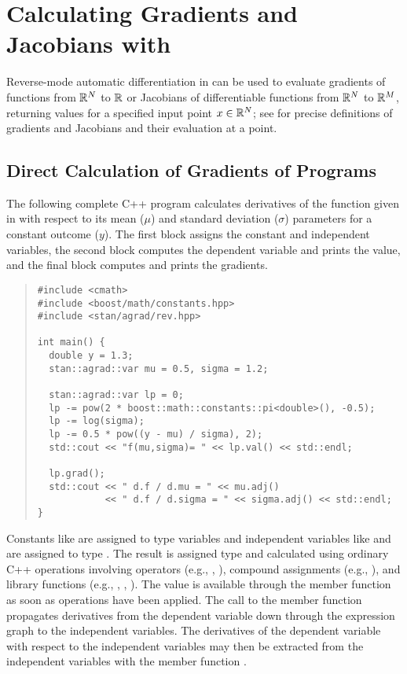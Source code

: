 \documentclass[10pt]{article}
\begin{document}
\section{Calculating Gradients and Jacobians with }

Reverse-mode automatic differentiation in  can be
used to evaluate gradients of functions from $\mathbb{R}^N$ to $\mathbb{R}$ or
Jacobians of differentiable functions from $\mathbb{R}^N$ to $\mathbb{R}^M$,
returning values for a specified input point $x \in \mathbb{R}^N$; see
 for precise definitions of
gradients and Jacobians and their evaluation at a point.

\subsection{Direct Calculation of Gradients of Programs}

The following complete C++ program calculates derivatives of the
function given in  with respect to its mean
($\mu$) and standard deviation ($\sigma$) parameters for a constant
outcome ($y$).  The first block assigns the constant and independent
variables, the second block computes the dependent variable and prints
the value, and the final block computes and prints the gradients.
%
\begin{quote}
\begin{Verbatim}
#include <cmath>
#include <boost/math/constants.hpp>
#include <stan/agrad/rev.hpp>

int main() { 
  double y = 1.3;
  stan::agrad::var mu = 0.5, sigma = 1.2;

  stan::agrad::var lp = 0;
  lp -= pow(2 * boost::math::constants::pi<double>(), -0.5);
  lp -= log(sigma);
  lp -= 0.5 * pow((y - mu) / sigma), 2);
  std::cout << "f(mu,sigma)= " << lp.val() << std::endl;

  lp.grad();
  std::cout << " d.f / d.mu = " << mu.adj()
            << " d.f / d.sigma = " << sigma.adj() << std::endl;
}
\end{Verbatim}
\end{quote}
%
Constants like  are assigned to type  variables
and independent variables like  and  are assigned
to type .  The result  is assigned type 
and calculated using ordinary C++ operations involving operators
(e.g., \code{*}, \code{/}), compound assignments (e.g., \code{-=}),
and library functions (e.g., , , ).  The
value is available through the member function  as soon as
operations have been applied.  The call to the member function
 propagates derivatives from the dependent variable
 down through the expression graph to the independent
variables.  The derivatives of the dependent variable with respect to
the independent variables may then be extracted from the independent
variables with the member function .
\end{document}
